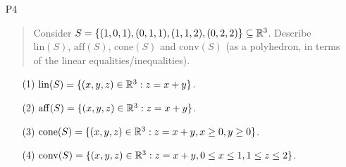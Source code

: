 \documentclass[12pt]{article}
\begin{document}
\begin{enumerate}
\begin{itemize}
\end{itemize}

\item[P4]

\begin{quote}
Consider $S = \{(1,0,1),(0,1,1),(1,1,2),(0,2,2)\} \subseteq {\mathbb R}^3$. Describe $\mathrm{lin}(S)$, $\mathrm{aff}(S)$, $\mathrm{cone}(S)$ and $\mathrm{conv}(S)$ (as a polyhedron, in terms of the linear equalities/inequalities).
\end{quote}

\begin{itemize}
\item[(1)] $\mathrm{lin}(S) = \{(x,y,z)\in{\mathbb R}^3: z = x+y\}$.
\item[(2)] $\mathrm{aff}(S) = \{(x,y,z)\in{\mathbb R}^3: z = x+y\}$.
\item[(3)] $\mathrm{cone}(S) = \{(x,y,z)\in{\mathbb R}^3: z = x+y, x \ge 0, y \ge 0\}$.
\item[(4)] $\mathrm{conv}(S) = \{(x,y,z)\in{\mathbb R}^3: z = x+y, 0 \le x \le 1, 1 \le z \le 2\}$.
\end{itemize}





\end{enumerate}
\end{document}
